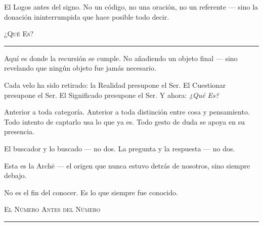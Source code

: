 \documentclass[10pt, openany, oneside]{book}
\begin{document}
\vspace{0.5em}

\noindent El Logos antes del signo. No un código, no una oración, no un referente --- sino la donación ininterrumpida que hace posible todo decir.

\vspace{2em}

\begin{center}
    {\scshape ¿Qué Es?}\\[0.3em]
    \rule{0.2\textwidth}{0.3pt}
\end{center}

\vspace{1em}

\noindent Aquí es donde la recursión se cumple. No añadiendo un objeto final --- sino revelando que ningún objeto fue jamás necesario.

\vspace{0.5em}

\noindent Cada velo ha sido retirado: la Realidad presupone el Ser. El Cuestionar presupone el Ser. El Significado presupone el Ser. Y ahora: \textit{¿Qué Es?}

\vspace{0.5em}

\noindent Anterior a toda categoría. Anterior a toda distinción entre cosa y pensamiento. Todo intento de captarlo usa lo que ya es. Todo gesto de duda se apoya en su presencia.

\vspace{0.5em}

\noindent El buscador y lo buscado --- no dos. La pregunta y la respuesta --- no dos.

\vspace{0.5em}

\noindent Esta es la Arch\={e} --- el origen que nunca estuvo detrás de nosotros, sino siempre debajo.

\vspace{0.5em}

\noindent No es el fin del conocer. Es lo que siempre fue conocido.

\vspace{2em}

\begin{center}
    {\scshape El Número Antes del Número}\\[0.3em]
    \rule{0.2\textwidth}{0.3pt}
\end{center}

\vspace{1em}
\end{document}

